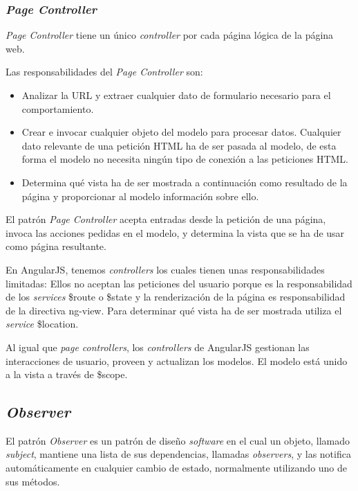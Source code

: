 \subsubsection{\textit{Page Controller}}
\textit{Page Controller} tiene un único \textit{controller} por cada página lógica de la página web\cite{martinfowlerdavidricematthewfoemmeledwardhieattrobertmeerandystafford2002}.


Las responsabilidades del \textit{Page Controller} son:


\begin{itemize}
\item Analizar la URL y extraer cualquier dato de formulario necesario para el comportamiento.
\item Crear e invocar cualquier objeto del modelo para procesar datos. Cualquier dato relevante de una petición HTML ha de ser pasada al modelo, de esta forma el modelo no necesita ningún tipo de conexión a las peticiones HTML.
\item Determina qué vista ha de ser mostrada a continuación como resultado de la página y proporcionar al modelo información sobre ello.
\end{itemize}


El patrón \textit{Page Controller} acepta entradas desde la petición de una página, invoca las acciones pedidas en el modelo, y determina la vista que se ha de usar como página resultante\cite{page_controller_microsoft}.


En AngularJS, tenemos \textit{controllers} los cuales tienen unas responsabilidades limitadas: Ellos no aceptan las peticiones del usuario porque es la responsabilidad de los \textit{services} \$route o \$state y la renderización de la página es responsabilidad de la directiva ng-view. Para determinar qué vista ha de ser mostrada utiliza el \textit{service} \$location.


Al igual que \textit{page controllers}, los \textit{controllers} de AngularJS gestionan las interacciones de usuario, proveen y actualizan los modelos. El modelo está unido a la vista a través de \$scope\cite{mgechev}.


\subsection{	\textit{Observer}}
El patrón \textit{Observer} es un patrón de diseño \textit{software} en el cual un objeto, llamado \textit{subject}, mantiene una lista de sus dependencias, llamadas \textit{observers}, y las notifica automáticamente en cualquier cambio de estado, normalmente utilizando uno de sus métodos. 


